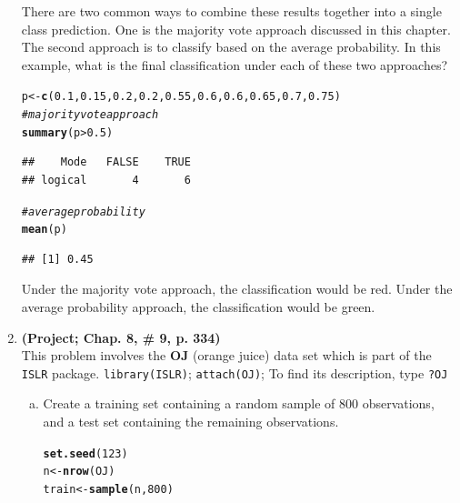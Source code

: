 \documentclass[12pt,fleqn]{article}\usepackage[]{graphicx}\usepackage[]{color}
\makeatletter
\newcommand{\hlnum}[1]{\textcolor[rgb]{0.686,0.059,0.569}{#1}}%
\newcommand{\hlcom}[1]{\textcolor[rgb]{0.678,0.584,0.686}{\textit{#1}}}%
\newcommand{\hlopt}[1]{\textcolor[rgb]{0,0,0}{#1}}%
\newcommand{\hlstd}[1]{\textcolor[rgb]{0.345,0.345,0.345}{#1}}%
\newcommand{\hlkwb}[1]{\textcolor[rgb]{0.69,0.353,0.396}{#1}}%
\newcommand{\hlkwd}[1]{\textcolor[rgb]{0.737,0.353,0.396}{\textbf{#1}}}%
\newenvironment{kframe}{%
 \def\at@end@of@kframe{}%
 \ifinner\ifhmode%
  \def\at@end@of@kframe{\end{minipage}}%
  \begin{minipage}{\columnwidth}%
 \fi\fi%
 \def\FrameCommand##1{\hskip\@totalleftmargin \hskip-\fboxsep
 \colorbox{shadecolor}{##1}\hskip-\fboxsep
     \hskip-\linewidth \hskip-\@totalleftmargin \hskip\columnwidth}%
 \MakeFramed {\advance\hsize-\width
   \@totalleftmargin\z@ \linewidth\hsize
   \@setminipage}}%
 {\par\unskip\endMakeFramed%
 \at@end@of@kframe}
\newenvironment{knitrout}{}{} %
\theoremstyle{definition}
\makeatother
\begin{document}
\begin{enumerate}[1.]
    There are two common ways to combine these results together into a single class prediction. One is the majority vote approach discussed in this chapter. The second approach is to classify based on the average probability. In this example, what is the final classification under each of these two approaches?
\begin{knitrout}
\color{fgcolor}\begin{kframe}
\begin{alltt}
\hlstd{p} \hlkwb{<-} \hlkwd{c}\hlstd{(}\hlnum{0.1}\hlstd{,} \hlnum{0.15}\hlstd{,} \hlnum{0.2}\hlstd{,} \hlnum{0.2}\hlstd{,} \hlnum{0.55}\hlstd{,} \hlnum{0.6}\hlstd{,} \hlnum{0.6}\hlstd{,} \hlnum{0.65}\hlstd{,} \hlnum{0.7}\hlstd{,} \hlnum{0.75}\hlstd{)}
  \hlcom{# majority vote approach}
\hlkwd{summary}\hlstd{(p}\hlopt{>}\hlnum{0.5}\hlstd{)}
\end{alltt}
\begin{verbatim}
##    Mode   FALSE    TRUE 
## logical       4       6
\end{verbatim}
\begin{alltt}
  \hlcom{# average probability}
\hlkwd{mean}\hlstd{(p)}
\end{alltt}
\begin{verbatim}
## [1] 0.45
\end{verbatim}
\end{kframe}
\end{knitrout}
    Under the majority vote approach, the classification would be red. Under the average probability approach, the classification would be green.
    \item \textbf{(Project; Chap. 8, \# 9, p. 334)}\\
    This problem involves the $\boldsymbol{OJ}$ (orange juice) data set which is part of the \texttt{ISLR} package. \texttt{library(ISLR)}; \texttt{attach(OJ)}; To find its description, type \texttt{?OJ}
      \begin{enumerate}[(a)]
        \item Create a training set containing a random sample of 800 observations, and a test set containing the remaining observations.
\begin{knitrout}
\color{fgcolor}\begin{kframe}
\begin{alltt}
\hlkwd{set.seed}\hlstd{(}\hlnum{123}\hlstd{)}
\hlstd{n} \hlkwb{<-} \hlkwd{nrow}\hlstd{(OJ)}
\hlstd{train} \hlkwb{<-} \hlkwd{sample}\hlstd{(n,} \hlnum{800}\hlstd{)}
\end{alltt}
\end{kframe}
\end{knitrout}


\end{enumerate}
\end{enumerate}
\end{document}
